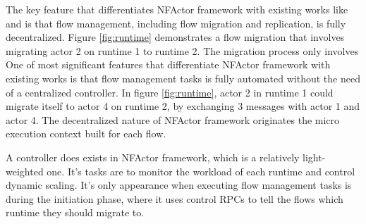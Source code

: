 The key feature that differentiates NFActor framework with existing works like \cite{gember2015opennf} and \cite{rajagopalan2013split} is that flow management, including flow migration and replication, is fully decentralized. Figure \ref{fig:runtime} demonstrates a flow migration that involves migrating actor 2 on runtime 1 to runtime 2. The migration process only involves 
One of most significant features that differentiate NFActor framework with existing works \cite{gember2015opennf} is that flow management tasks is fully automated without the need of a centralized controller. In figure \ref{fig:runtime}, actor 2 in runtime 1 could migrate itself to actor 4 on runtime 2, by exchanging 3 messages with actor 1 and actor 4. The decentralized nature of NFActor framework originates the micro execution context built for each flow.

A controller does exists in NFActor framework, which is a relatively light-weighted one. It's tasks are to monitor the workload of each runtime and control dynamic scaling. It's only appearance when executing flow management tasks is during the initiation phase, where it uses control RPCs to tell the flows which runtime they should migrate to.
